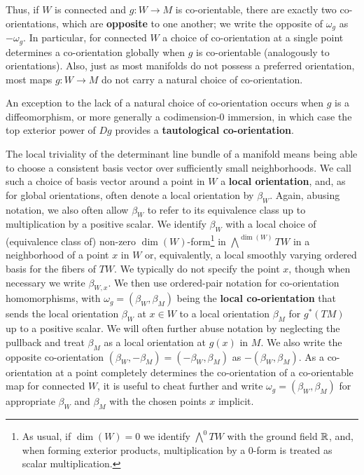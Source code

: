 Thus, if $W$ is connected and $g \colon W \to M$ is co-orientable, there are exactly two co-orientations, which are \textbf{opposite} to one another; we write the opposite of $\omega_g$ as $-\omega_g$.
In particular, for connected $W$ a choice of co-orientation at a single point determines a co-orientation globally when $g$ is co-orientable (analogously to orientations).
Also, just as most manifolds do not possess a preferred orientation, most maps $g \colon W \to M$ do not carry a natural choice of co-orientation.

\begin{definition}\label{D: tautological co-orientation}
	An exception to the lack of a natural choice of co-orientation occurs when $g$ is a diffeomorphism, or more generally a codimension-0 immersion, in which case the top exterior power of $Dg$ provides a \textbf{tautological co-orientation}.
\end{definition}

The local triviality of the determinant line bundle of a manifold means being able to choose a consistent basis vector over sufficiently small neighborhoods.
We call such a choice of basis vector around a point in $W$ a \textbf{local orientation}, and, as for global orientations, often denote a local orientation by $\beta_W$.
Again, abusing notation, we also often allow $\beta_W$ to refer to its equivalence class up to multiplication by a positive scalar.
We identify $\beta_W$ with a local choice of (equivalence class of) non-zero $\dim(W)$-form\footnote{As usual, if $\dim(W) = 0$ we identify $\bigwedge^0 TW$ with the ground field $\mathbb{R}$, and, when forming exterior products, multiplication by a $0$-form is treated as scalar multiplication.} in $\bigwedge^{\dim(W)}TW$ in a neighborhood of a point $x$ in $W$ or, equivalently, a local smoothly varying ordered basis for the fibers of $TW$.
We typically do not specify the point $x$, though when necessary we write $\beta_{W,x}$.
We then use ordered-pair notation for co-orientation homomorphisms, with $\omega_g = (\beta_W, \beta_M)$ being the \textbf{local co-orientation} that sends the local orientation $\beta_W$ at $x \in W$ to a local orientation $\beta_M$ for $g^*(TM)$ up to a positive scalar.
We will often further abuse notation by neglecting the pullback and treat $\beta_M$ as a local orientation at $g(x)$ in $M$.
We also write the opposite co-orientation $(\beta_W,-\beta_M) = (-\beta_W,\beta_M)$ as $-(\beta_W,\beta_M)$.
As a co-orientation at a point completely determines the co-orientation of a co-orientable map for connected $W$, it is useful to cheat further and write $\omega_g = (\beta_W,\beta_M)$ for appropriate $\beta_W$ and $\beta_M$ with the chosen points $x$ implicit.

